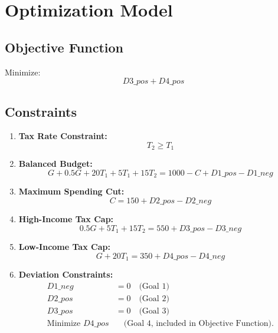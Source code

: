 \documentclass[12pt]{article}
\begin{document}
\section*{Optimization Model}

\subsection*{Objective Function}
Minimize:
\[
D3\_pos + D4\_pos
\]

\subsection*{Constraints}
\begin{enumerate}
    \item \textbf{Tax Rate Constraint:}
    \[
    T_2 \geq T_1
    \]

    \item \textbf{Balanced Budget:}
    \[
    G + 0.5G + 20T_1 + 5T_1 + 15T_2 = 1000 - C + D1\_pos - D1\_neg
    \]

    \item \textbf{Maximum Spending Cut:}
    \[
    C = 150 + D2\_pos - D2\_neg
    \]

    \item \textbf{High-Income Tax Cap:}
    \[
    0.5G + 5T_1 + 15T_2 = 550 + D3\_pos - D3\_neg
    \]

    \item \textbf{Low-Income Tax Cap:}
    \[
    G + 20T_1 = 350 + D4\_pos - D4\_neg
    \]

    \item \textbf{Deviation Constraints:}
    \begin{align*}
    D1\_neg &= 0 \quad \text{(Goal 1)} \\
    D2\_pos &= 0 \quad \text{(Goal 2)} \\
    D3\_pos &= 0 \quad \text{(Goal 3)} \\
    \text{Minimize } D4\_pos &\quad \text{(Goal 4, included in Objective Function).}
    \end{align*}
\end{enumerate}
\end{document}
